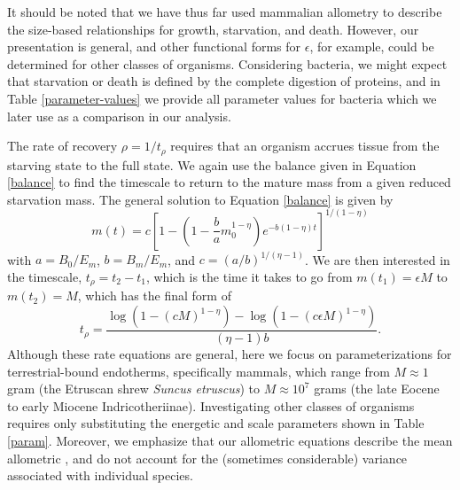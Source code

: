 \documentclass{pnastwo}
\begin{document}
\begin{article}
It should be noted that we have thus far used mammalian allometry to describe the size-based relationships for growth, starvation, and death. However, our presentation is general, and other functional forms for $\epsilon$, for example, could be determined for other classes of organisms. Considering bacteria, we might expect that starvation or death is defined by the complete digestion of proteins, and in Table \ref{parameter-values} we provide all parameter values for bacteria which we later use as a comparison in our analysis. 

The rate of recovery $\rho = 1/t_\rho$ requires that an organism accrues tissue from the starving state to the full state.
We again use the balance given in Equation \ref{balance} to find the timescale to return to the mature mass from a given reduced starvation mass. The general solution to Equation \ref{balance} is given by
\begin{equation}
m\left(t\right)=c\left[1-\left(1-\frac{b}{a}m_{0}^{1-\eta}\right)e^{-b\left(1-\eta\right)t}\right]^{1/\left(1-\eta\right)}%
\end{equation}
with $a=B_{0}/E_{m}$, $b=B_{m}/E_{m}$, and $c=(a/b)^{1/(\eta-1)}$. We are then interested in the timescale, $t_{\rho}=t_{2}-t_{1}$, which is the time it takes to go from $m\left(t_{1}\right)=\epsilon M$ to $m\left(t_{2}\right)=M$, which has the final form of 
\begin{equation}
t_{\rho}=\frac{\log \left(1-\left(cM \right)^{1-\eta }\right)-\log \left(1-\left(c\epsilon M \right)^{1-\eta }\right)}{(\eta -1) b}.
\end{equation}
Although these rate equations are general, here we focus on parameterizations for terrestrial-bound endotherms, specifically mammals, which range from $M\approx1$ gram (the Etruscan shrew \emph{Suncus etruscus}) to $M\approx10^7$ grams (the late Eocene to early Miocene Indricotheriinae).
Investigating other classes of organisms requires only substituting the energetic and scale parameters shown in Table \ref{param}.
Moreover, we emphasize that our allometric equations describe the mean allometric , and do not account for the (sometimes considerable) variance associated with individual species. 






\end{article}
\end{document}
